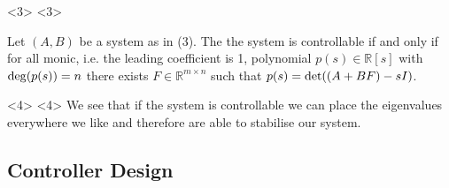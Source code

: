 \begin{frame}
\begin{onlyenv}<3>
<3>
	\begin{mythm}\label{thm:PP}
		Let $(A,B)$ be a system as in (3). The the system is controllable if and only if for all monic, i.e. the leading coefficient is 1, polynomial $p(s) \in\mathbb{R}[s]$ with $\operatorname{deg}(p(s)) = n$ there exists $F\in\mathbb{R}^{m\times n}$ such that $p(s) = \operatorname{det}((A+BF)-sI)$.
	\end{mythm}
\end{onlyenv}

\begin{onlyenv}<4>
<4>
	We see that if the system is controllable we can place the eigenvalues everywhere we like and therefore are able to stabilise our system.
\end{onlyenv}

\end{frame}

\subsection{Controller Design}

